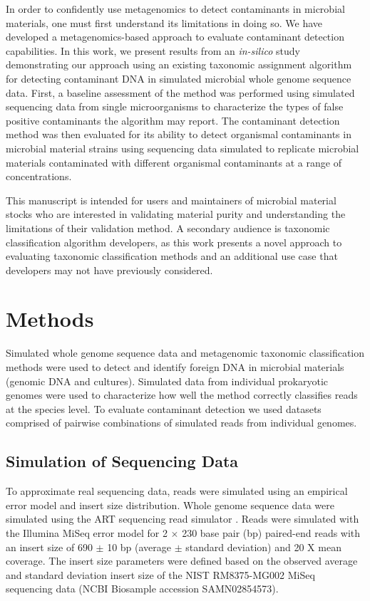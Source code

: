 \documentclass[fleqn,10pt,lineno]{wlpeerj}\usepackage[]{graphicx}\usepackage[]{color}
\begin{document}
In order to confidently use metagenomics to detect contaminants in microbial materials, one must first understand its limitations in doing so. 
We have developed a metagenomics-based approach to evaluate contaminant detection capabilities. 
In this work, we present results from an \textit{in-silico} study demonstrating our approach using an existing taxonomic assignment algorithm for detecting contaminant DNA in simulated microbial whole genome sequence data.
First, a baseline assessment of the method was performed using simulated sequencing data from single microorganisms to characterize the types of false positive contaminants the algorithm may report.
The contaminant detection method was then evaluated for its ability to detect organismal contaminants in microbial material strains using sequencing data simulated to replicate microbial materials contaminated with different organismal contaminants at a range of concentrations.   

This manuscript is intended for users and maintainers of microbial material stocks who are interested in validating material purity and understanding the limitations of their validation method. A secondary audience is taxonomic classification algorithm developers, as this work presents a novel approach to evaluating taxonomic classification methods and an additional use case that developers may not have previously considered.

\section*{Methods}
Simulated whole genome sequence data and metagenomic taxonomic classification methods were used to detect and identify foreign DNA in microbial materials (genomic DNA and cultures).
Simulated data from individual prokaryotic genomes were used to characterize how well the method correctly classifies reads at the species level.
To evaluate contaminant detection we used datasets comprised of pairwise combinations of simulated reads from individual genomes.

\subsection*{Simulation of Sequencing Data}
To approximate real sequencing data, reads were simulated using an empirical error model and insert size distribution.
Whole genome sequence data were simulated using the ART sequencing read simulator \citep{Huang2012}. 
Reads were simulated with the Illumina MiSeq error model for 2 $\times$ 230 base pair (bp) paired-end reads with an insert size of 690 $\pm$ 10 bp (average $\pm$ standard deviation) and 20 X mean coverage.
The insert size parameters were defined based on the observed average and standard deviation insert size of the NIST RM8375-MG002 MiSeq sequencing data \citep{olson2016pepr} (NCBI Biosample accession SAMN02854573).
\end{document}
